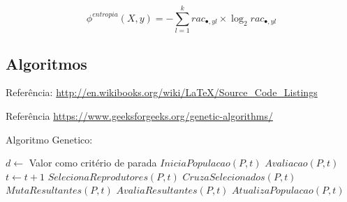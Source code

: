 \begin{equation} \label{eq:DT3} 
\phi^{entropia}(X, y) = -\sum_{l=1}^{k} rac_{\bullet, yl} \times \log_{2} rac_{\bullet, yl}
\end{equation}

\subsection{Algoritmos}\label{sec:Algoritmos}
Referência: \url{http://en.wikibooks.org/wiki/LaTeX/Source_Code_Listings}



Referência \url{https://www.geeksforgeeks.org/genetic-algorithms/}

\begin{algorithm}
	\caption{Algoritmo Genetico:}
	\label{alg:algoritmogenetico}
	\begin{algorithmic}[1]
		\STATE $d \leftarrow$ Valor como critério de parada
		\STATE $IniciaPopulacao(P, t)$
		\STATE $Avaliacao(P, t)$
		\STATE $t \leftarrow t + 1$
		\STATE $SelecionaReprodutores(P, t)$
		\STATE $CruzaSelecionados(P, t)$
		\STATE $MutaResultantes(P, t)$
		\STATE $AvaliaResultantes(P, t)$
		\STATE $AtualizaPopulacao(P, t)$
		\ENDWHILE
	\end{algorithmic}
\end{algorithm}

